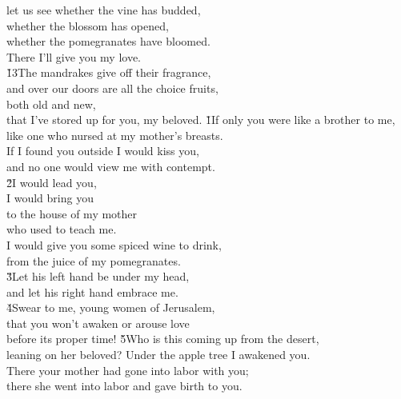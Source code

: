 \begin{poetry}
\poemll    let us see whether the vine has budded, \\
\poeml whether the blossom has opened, \\
\poemll    whether the pomegranates have bloomed. \\
\poemlll       There I'll give you my love. \\
\poeml \v{13}The mandrakes give off their fragrance, \\
\poemll    and over our doors are all the choice fruits, \\
\poeml both old and new, \\
\poemll    that I've stored up for you, my beloved.
\poeml {}
\v{1}If only you were like a brother to me, \\
\poeml like one who nursed at my mother's breasts. \\
\poeml If I found you outside I would kiss you, \\
\poeml and no one would view me with contempt. \\
\poeml \v{2}I would lead you, \\
\poemll    I would bring you \\
\poeml to the house of my mother \\
\poemll    who used to teach me. \\
\poeml I would give you some spiced wine to drink, \\
\poemll    from the juice of my pomegranates. \\
\poeml \v{3}Let his left hand be under my head, \\
\poemll    and let his right hand embrace me. \\
\poeml \v{4}Swear to me, young women of Jerusalem, \\
\poemll    that you won't awaken or arouse love \\
\poemlll       before its proper time!
\poeml \v{5}Who is this coming up from the desert, \\
\poemll    leaning on her beloved?
\poeml Under the apple tree I awakened you. \\
\poemll    There your mother had gone into labor with you; \\
\poemlll       there she went into labor and gave birth to you. \\

\end{poetry}
